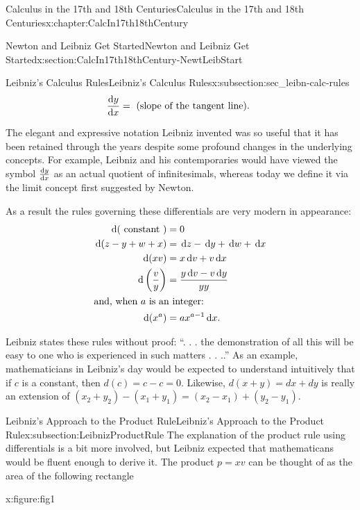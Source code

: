 \begin{chapterptx}{Calculus in the 17th and 18th Centuries}{}{Calculus in the 17th and 18th Centuries}{}{}{x:chapter:CalcIn17th18thCentury}
\begin{sectionptx}{Newton and Leibniz Get Started}{}{Newton and Leibniz Get Started}{}{}{x:section:CalcIn17th18thCentury-NewtLeibStart}
\begin{subsectionptx}{Leibniz's Calculus Rules}{}{Leibniz's Calculus Rules}{}{}{x:subsection:sec_leibn-calc-rules}
			\begin{equation*}
				\frac{\text{d}{y}}{\text{d}{x}}= \text{ (slope of the tangent line). }
			\end{equation*}
			\par
			The elegant and expressive notation Leibniz invented was so useful that it has been retained through the years despite some profound changes in the underlying concepts.  For example, Leibniz and his contemporaries would have viewed the symbol \(\frac{\text{d}{y}}{\text{d}{x}}\) as an actual quotient of infinitesimals, whereas today we define it via the limit concept first suggested by Newton.  %
			\par
			As a result the rules governing these differentials are very modern in appearance: %
			\begin{align*}
				\,{\rm d}(\text{ constant } )& =0\\
				\,{\rm d}(z-y+w+x)& =\,{\rm d} z-\,{\rm d} y+\,{\rm d} w+\,{\rm d} x\\
				\,{\rm d}(xv)& =x\,{\rm d} v+v\,{\rm d} x\\
				\,{\rm d}\left(\frac{v}{y}\right)& =\frac{y\,{\rm d} v-v\,{\rm d} y}{yy}\\
				\intertext{and, when \(a\) is an integer:}
				\,{\rm d}(x^a)& =ax^{a-1}\,{\rm d} x\text{.}
			\end{align*}
			\par
			Leibniz states these rules without proof: ``. . . the demonstration of all this will be easy to one who is experienced in such matters . . ..'' As an example, mathematicians in Leibniz's day would be expected to understand intuitively that if \(c\) is a constant, then \(d(c)=c-c=0\).  Likewise, \(d(x+y)=dx+dy\) is really an extension of \((x_2+y_2)-(x_1+y_1)=(x_2-x_1)+(y_2-y_1)\).%
		\end{subsectionptx}
		\typeout{************************************************}
		\typeout{************************************************}
		\begin{subsectionptx}{Leibniz's Approach to the Product Rule}{}{Leibniz's Approach to the Product Rule}{}{}{x:subsection:LeibnizProductRule}
			 The explanation of the product rule using differentials is a bit more involved, but Leibniz expected that mathematicans would be fluent enough to derive it.  The product \(p=xv\) can be thought of as the area of the following rectangle%
			\begin{figureptx}{}{x:figure:fig1}{}%

\end{figureptx}
\end{subsectionptx}
\end{sectionptx}
\end{chapterptx}
